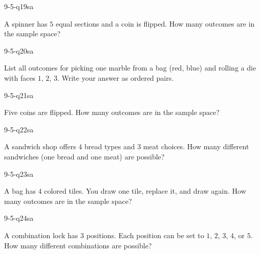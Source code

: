 \begin{practiceQuestion}{9-5-q19}{sa}
\begin{questionText}
A spinner has $5$ equal sections and a coin is flipped. How many outcomes are in the sample space?
\end{questionText}
\end{practiceQuestion}

\begin{practiceQuestion}{9-5-q20}{sa}
\begin{questionText}
List all outcomes for picking one marble from a bag (red, blue) and rolling a die with faces $1$, $2$, $3$. Write your answer as ordered pairs.
\end{questionText}
\end{practiceQuestion}

\begin{practiceQuestion}{9-5-q21}{sa}
\begin{questionText}
Five coins are flipped. How many outcomes are in the sample space?
\end{questionText}
\end{practiceQuestion}

\begin{practiceQuestion}{9-5-q22}{sa}
\begin{questionText}
A sandwich shop offers $4$ bread types and $3$ meat choices. How many different sandwiches (one bread and one meat) are possible?
\end{questionText}
\end{practiceQuestion}

\begin{practiceQuestion}{9-5-q23}{sa}
\begin{questionText}
A bag has $4$ colored tiles. You draw one tile, replace it, and draw again. How many outcomes are in the sample space?
\end{questionText}
\end{practiceQuestion}

\begin{practiceQuestion}{9-5-q24}{sa}
\begin{questionText}
A combination lock has $3$ positions. Each position can be set to $1$, $2$, $3$, $4$, or $5$. How many different combinations are possible?
\end{questionText}
\end{practiceQuestion}

